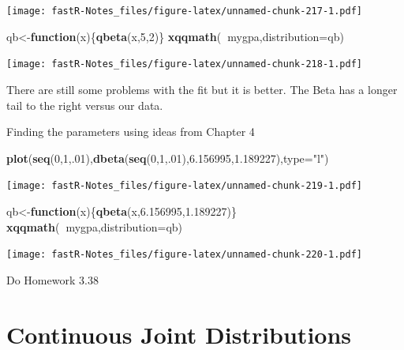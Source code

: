 \documentclass[]{book}
\newenvironment{Shaded}{\begin{snugshade}}{\end{snugshade}}
\newcommand{\KeywordTok}[1]{\textcolor[rgb]{0.13,0.29,0.53}{\textbf{#1}}}
\newcommand{\DataTypeTok}[1]{\textcolor[rgb]{0.13,0.29,0.53}{#1}}
\newcommand{\DecValTok}[1]{\textcolor[rgb]{0.00,0.00,0.81}{#1}}
\newcommand{\FloatTok}[1]{\textcolor[rgb]{0.00,0.00,0.81}{#1}}
\newcommand{\StringTok}[1]{\textcolor[rgb]{0.31,0.60,0.02}{#1}}
\newcommand{\ControlFlowTok}[1]{\textcolor[rgb]{0.13,0.29,0.53}{\textbf{#1}}}
\newcommand{\OperatorTok}[1]{\textcolor[rgb]{0.81,0.36,0.00}{\textbf{#1}}}
\newcommand{\NormalTok}[1]{#1}
\theoremstyle{definition}
\theoremstyle{definition}
\theoremstyle{definition}
\theoremstyle{remark}
\begin{document}
\texttt{[image: fastR-Notes\_files/figure-latex/unnamed-chunk-217-1.pdf]}

\begin{Shaded}
\begin{Highlighting}[]
\NormalTok{qb<-}\ControlFlowTok{function}\NormalTok{(x)\{}\KeywordTok{qbeta}\NormalTok{(x,}\DecValTok{5}\NormalTok{,}\DecValTok{2}\NormalTok{)\}}
\KeywordTok{xqqmath}\NormalTok{(}\OperatorTok{~}\NormalTok{mygpa,}\DataTypeTok{distribution=}\NormalTok{qb)}
\end{Highlighting}
\end{Shaded}

\texttt{[image: fastR-Notes\_files/figure-latex/unnamed-chunk-218-1.pdf]}

There are still some problems with the fit but it is better. The Beta
has a longer tail to the right versus our data.

Finding the parameters using ideas from Chapter 4

\begin{Shaded}
\begin{Highlighting}[]
\KeywordTok{plot}\NormalTok{(}\KeywordTok{seq}\NormalTok{(}\DecValTok{0}\NormalTok{,}\DecValTok{1}\NormalTok{,.}\DecValTok{01}\NormalTok{),}\KeywordTok{dbeta}\NormalTok{(}\KeywordTok{seq}\NormalTok{(}\DecValTok{0}\NormalTok{,}\DecValTok{1}\NormalTok{,.}\DecValTok{01}\NormalTok{),}\FloatTok{6.156995}\NormalTok{,}\FloatTok{1.189227}\NormalTok{),}\DataTypeTok{type=}\StringTok{"l"}\NormalTok{)}
\end{Highlighting}
\end{Shaded}

\texttt{[image: fastR-Notes\_files/figure-latex/unnamed-chunk-219-1.pdf]}

\begin{Shaded}
\begin{Highlighting}[]
\NormalTok{qb<-}\ControlFlowTok{function}\NormalTok{(x)\{}\KeywordTok{qbeta}\NormalTok{(x,}\FloatTok{6.156995}\NormalTok{,}\FloatTok{1.189227}\NormalTok{)\}}
\KeywordTok{xqqmath}\NormalTok{(}\OperatorTok{~}\NormalTok{mygpa,}\DataTypeTok{distribution=}\NormalTok{qb)}
\end{Highlighting}
\end{Shaded}

\texttt{[image: fastR-Notes\_files/figure-latex/unnamed-chunk-220-1.pdf]}

Do Homework 3.38

\hypertarget{L17}{\section{Continuous Joint Distributions}\label{L17}}
\end{document}
